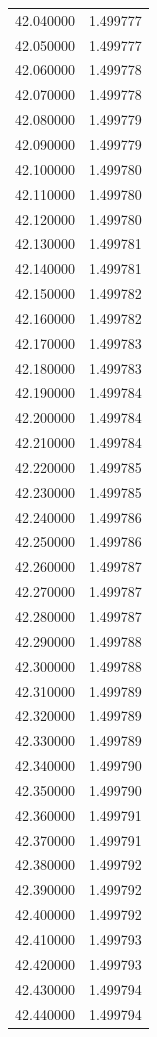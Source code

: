 \begin{tabular}{rr}
42.040000 & 1.499777 \\
42.050000 & 1.499777 \\
42.060000 & 1.499778 \\
42.070000 & 1.499778 \\
42.080000 & 1.499779 \\
42.090000 & 1.499779 \\
42.100000 & 1.499780 \\
42.110000 & 1.499780 \\
42.120000 & 1.499780 \\
42.130000 & 1.499781 \\
42.140000 & 1.499781 \\
42.150000 & 1.499782 \\
42.160000 & 1.499782 \\
42.170000 & 1.499783 \\
42.180000 & 1.499783 \\
42.190000 & 1.499784 \\
42.200000 & 1.499784 \\
42.210000 & 1.499784 \\
42.220000 & 1.499785 \\
42.230000 & 1.499785 \\
42.240000 & 1.499786 \\
42.250000 & 1.499786 \\
42.260000 & 1.499787 \\
42.270000 & 1.499787 \\
42.280000 & 1.499787 \\
42.290000 & 1.499788 \\
42.300000 & 1.499788 \\
42.310000 & 1.499789 \\
42.320000 & 1.499789 \\
42.330000 & 1.499789 \\
42.340000 & 1.499790 \\
42.350000 & 1.499790 \\
42.360000 & 1.499791 \\
42.370000 & 1.499791 \\
42.380000 & 1.499792 \\
42.390000 & 1.499792 \\
42.400000 & 1.499792 \\
42.410000 & 1.499793 \\
42.420000 & 1.499793 \\
42.430000 & 1.499794 \\
42.440000 & 1.499794 \\

\end{tabular}
